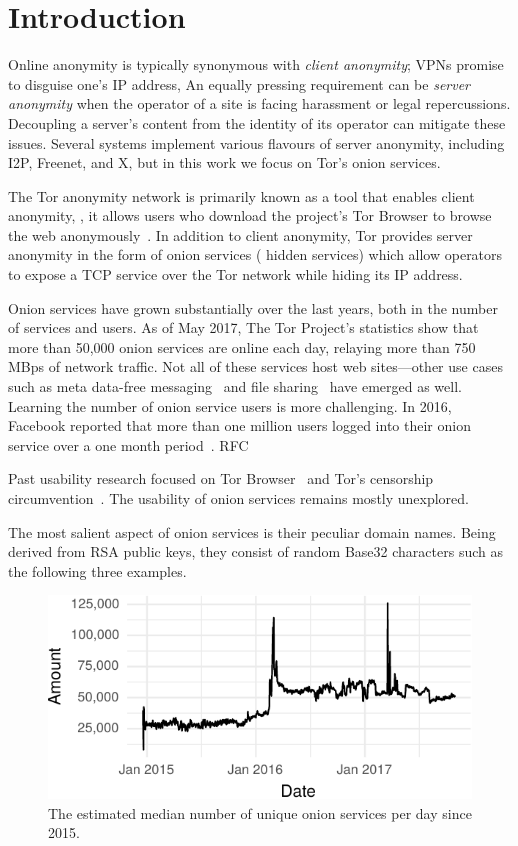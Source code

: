\section{Introduction}
\label{sec:introduction}

Online anonymity is typically synonymous with \emph{client anonymity}; VPNs
promise to disguise one's IP address, An equally pressing requirement can be
\emph{server anonymity} when the operator of a site is facing harassment or legal
repercussions.  Decoupling a server's content from the identity of its operator
can mitigate these issues.  Several systems implement various flavours of server
anonymity, including I2P, Freenet, and X, but in this work we focus on Tor's
onion services.

The Tor anonymity network is primarily known as a tool that enables client
anonymity, \ie, it allows users who download the project's Tor Browser to
browse the web anonymously~\cite{Dingledine2004a}.  In addition to client
anonymity, Tor provides server anonymity in the form of onion services (\aka
hidden services) which allow operators to expose a TCP service over the Tor
network while hiding its IP address.

Onion services have grown substantially over the last years, both in the number
of services and users.  As of May 2017, The Tor Project's statistics show that
more than 50,000 onion services are online each day, relaying more than 750 MBps
of network traffic.  Not all of these services host web sites---other use cases
such as meta data-free messaging~\cite{ricochet} and file
sharing~\cite{onionshare} have emerged as well.  Learning the number of onion
service users is more challenging.  In 2016, Facebook reported that more than
one million users logged into their onion service over a one month
period~\cite{facebook-users}.
RFC~\cite{rfc7686}

Past usability research focused on Tor Browser~\cite{Clark2007a,Norcie2014a}
and Tor's censorship circumvention~\cite{Fifield2015a}.  The usability of onion
services remains mostly unexplored.

The most salient aspect of onion services is their peculiar domain names.
Being derived from RSA public keys, they consist of random Base32 characters
such as the following three examples.

\begin{figure}[t]
\includegraphics[width=\linewidth]{figures/os-growth.pdf}
\caption{The estimated median number of unique onion services per day since
2015.}
\label{fig:os-growth}
\end{figure}

